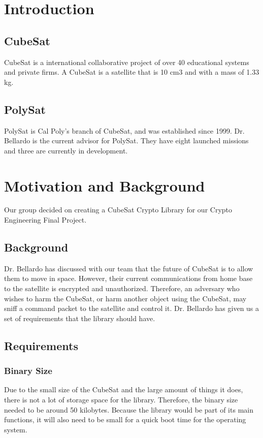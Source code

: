 \documentclass[12pt]{article}
\begin{document}
\begin{multicols}{2}
\section{Introduction}
\subsection{CubeSat}
CubeSat is a international collaborative project of over 40 educational systems and private firms. A CubeSat is a satellite that is 10 cm3 and with a mass of 1.33 kg. 
\subsection{PolySat}
PolySat is Cal Poly’s branch of CubeSat, and was established since 1999. Dr. Bellardo is the current advisor for PolySat. They have eight launched missions and three are currently in development. 
\section{Motivation and Background}
Our group decided on creating a CubeSat Crypto Library for our Crypto Engineering Final Project. 
\subsection{Background}
Dr. Bellardo has discussed with our team that the future of CubeSat is to allow them to move in space. However, their current communications from home base to the satellite is encrypted and unauthorized.  Therefore, an adversary who wishes to harm the CubeSat, or harm another object using the CubeSat, may sniff a command packet to the satellite and control it. Dr. Bellardo has given us a set of requirements that the library should have.
\subsection{Requirements}
\subsubsection{Binary Size}
Due to the small size of the CubeSat and the large amount of things it does, there is not a lot of storage space for the library. Therefore, the binary size needed to be around 50 kilobytes. Because the library would be part of its main functions, it will also need to be small for a quick boot time for the operating system. 

\end{multicols}
\end{document}

